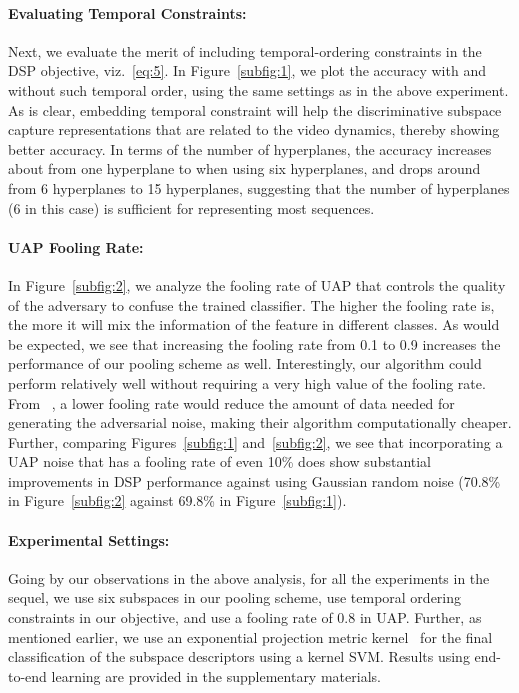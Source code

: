 \documentclass[runningheads]{llncs}
\newcommand{\para}[1]{\noindent\paragraph*{\textbf{#1}}}
\begin{document}
\para{Evaluating Temporal Constraints:} Next, we evaluate the merit of including temporal-ordering constraints in the DSP objective, viz.~\eqref{eq:5}. In Figure~\ref{subfig:1}, we plot the accuracy with and without such temporal order, using the same settings as in the above experiment. As is clear, embedding temporal constraint will help the discriminative subspace capture representations that are related to the video dynamics, thereby showing better accuracy. In terms of the number of hyperplanes, the accuracy increases about  from one hyperplane to when using six hyperplanes, and drops around  from 6 hyperplanes to 15 hyperplanes, suggesting that the number of hyperplanes (6 in this case) is sufficient for representing most sequences. 

\para{UAP Fooling Rate:} In Figure~\ref{subfig:2}, we analyze the fooling rate of UAP that controls the quality of the adversary to confuse the trained classifier. The higher the fooling rate is, the more it will mix the information of the feature in different classes. As would be expected, we see that increasing the fooling rate from 0.1 to 0.9 increases the performance of our pooling scheme as well. Interestingly, our algorithm could perform relatively well without requiring a very high value of the fooling rate. From ~\cite{moosavi2017universal}, a lower fooling rate would reduce the amount of data needed for generating the adversarial noise, making their algorithm computationally cheaper. Further, comparing Figures~\ref{subfig:1} and~\ref{subfig:2}, we see that incorporating a UAP noise that has a fooling rate of even 10\% does show substantial improvements in DSP performance against using Gaussian random noise (70.8\% in Figure~\ref{subfig:2} against 69.8\% in Figure~\ref{subfig:1}).



\paragraph*{\textbf{Experimental Settings:}} Going by our observations in the above analysis, for all the experiments in the sequel, we use six subspaces in our pooling scheme, use temporal ordering constraints in our objective, and use a fooling rate of 0.8 in UAP. Further, as mentioned earlier, we use an exponential projection metric kernel~\cite{cherian2018non} for the final classification of the subspace descriptors using a kernel SVM. Results using end-to-end learning are provided in the supplementary materials. 
\end{document}
